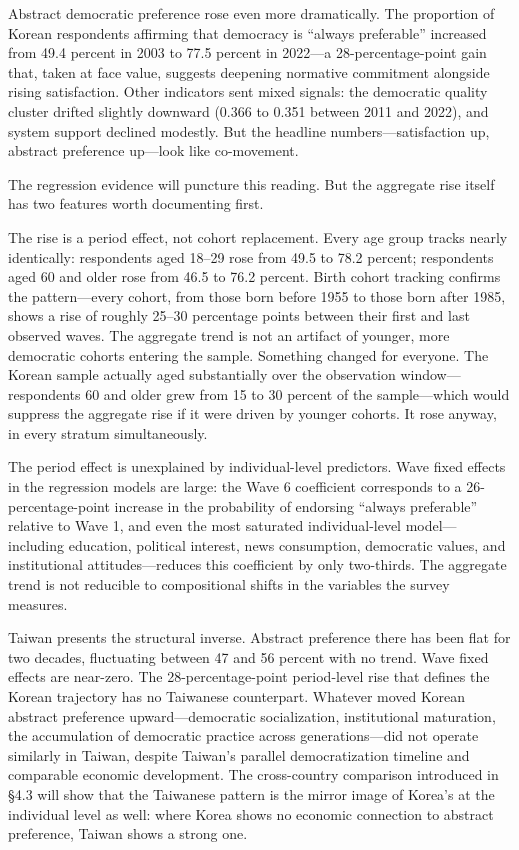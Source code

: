 \documentclass[
  12pt,
  12pt,
  letterpaper]{article}
\begin{document}
Abstract democratic preference rose even more dramatically. The
proportion of Korean respondents affirming that democracy is ``always
preferable'' increased from 49.4 percent in 2003 to 77.5 percent in
2022---a 28-percentage-point gain that, taken at face value, suggests
deepening normative commitment alongside rising satisfaction. Other
indicators sent mixed signals: the democratic quality cluster drifted
slightly downward (0.366 to 0.351 between 2011 and 2022), and system
support declined modestly. But the headline numbers---satisfaction up,
abstract preference up---look like co-movement.

The regression evidence will puncture this reading. But the aggregate
rise itself has two features worth documenting first.

The rise is a period effect, not cohort replacement. Every age group
tracks nearly identically: respondents aged 18--29 rose from 49.5 to
78.2 percent; respondents aged 60 and older rose from 46.5 to 76.2
percent. Birth cohort tracking confirms the pattern---every cohort, from
those born before 1955 to those born after 1985, shows a rise of roughly
25--30 percentage points between their first and last observed waves.
The aggregate trend is not an artifact of younger, more democratic
cohorts entering the sample. Something changed for everyone. The Korean
sample actually aged substantially over the observation
window---respondents 60 and older grew from 15 to 30 percent of the
sample---which would suppress the aggregate rise if it were driven by
younger cohorts. It rose anyway, in every stratum simultaneously.

The period effect is unexplained by individual-level predictors. Wave
fixed effects in the regression models are large: the Wave 6 coefficient
corresponds to a 26-percentage-point increase in the probability of
endorsing ``always preferable'' relative to Wave 1, and even the most
saturated individual-level model---including education, political
interest, news consumption, democratic values, and institutional
attitudes---reduces this coefficient by only two-thirds. The aggregate
trend is not reducible to compositional shifts in the variables the
survey measures.

Taiwan presents the structural inverse. Abstract preference there has
been flat for two decades, fluctuating between 47 and 56 percent with no
trend. Wave fixed effects are near-zero. The 28-percentage-point
period-level rise that defines the Korean trajectory has no Taiwanese
counterpart. Whatever moved Korean abstract preference
upward---democratic socialization, institutional maturation, the
accumulation of democratic practice across generations---did not operate
similarly in Taiwan, despite Taiwan's parallel democratization timeline
and comparable economic development. The cross-country comparison
introduced in §4.3 will show that the Taiwanese pattern is the mirror
image of Korea's at the individual level as well: where Korea shows no
economic connection to abstract preference, Taiwan shows a strong one.
\end{document}
